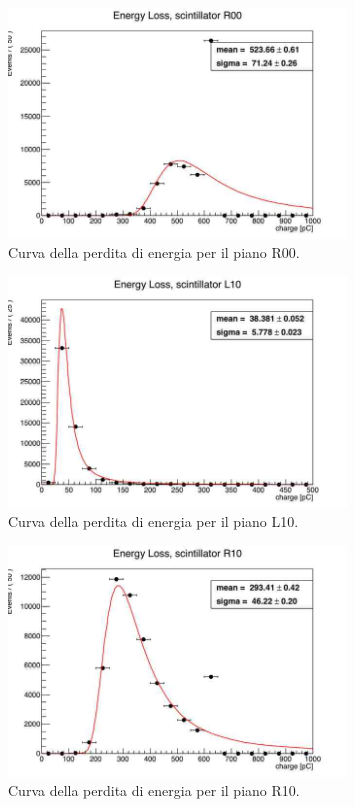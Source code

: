 \begin{figure}[H]
  \centering
  \includegraphics[width=0.8\textwidth]{plots/energy_R00.jpg}
  \caption{Curva della perdita di energia per il piano R00.}
  \label{fig:r00}
\end{figure}

\begin{figure}[H]
  \centering
  \includegraphics[width=0.8\textwidth]{plots/energy_L10.jpg}
  \caption{Curva della perdita di energia per il piano L10.}
  \label{fig:l10}
\end{figure}

\begin{figure}[H]
  \centering
  \includegraphics[width=0.8\textwidth]{plots/energy_R10.jpg}
  \caption{Curva della perdita di energia per il piano R10.}
  \label{fig:r10}
\end{figure}

